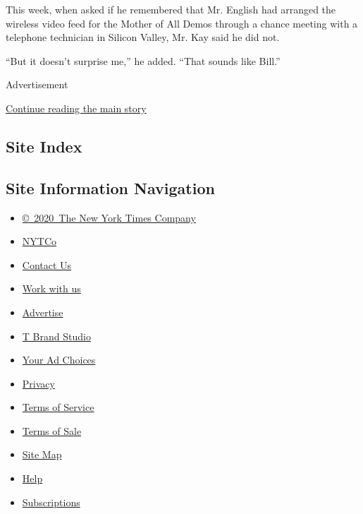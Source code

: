 This week, when asked if he remembered that Mr. English had arranged the
wireless video feed for the Mother of All Demos through a chance meeting
with a telephone technician in Silicon Valley, Mr. Kay said he did not.

``But it doesn't surprise me,'' he added. ``That sounds like Bill.''

Advertisement

\protect\hyperlink{after-bottom}{Continue reading the main story}

\hypertarget{site-index}{%
\subsection{Site Index}\label{site-index}}

\hypertarget{site-information-navigation}{%
\subsection{Site Information
Navigation}\label{site-information-navigation}}

\begin{itemize}
\tightlist
\item
  \href{https://help.nytimes3xbfgragh.onion/hc/en-us/articles/115014792127-Copyright-notice}{©~2020~The
  New York Times Company}
\end{itemize}

\begin{itemize}
\tightlist
\item
  \href{https://www.nytco.com/}{NYTCo}
\item
  \href{https://help.nytimes3xbfgragh.onion/hc/en-us/articles/115015385887-Contact-Us}{Contact
  Us}
\item
  \href{https://www.nytco.com/careers/}{Work with us}
\item
  \href{https://nytmediakit.com/}{Advertise}
\item
  \href{http://www.tbrandstudio.com/}{T Brand Studio}
\item
  \href{https://www.nytimes3xbfgragh.onion/privacy/cookie-policy\#how-do-i-manage-trackers}{Your
  Ad Choices}
\item
  \href{https://www.nytimes3xbfgragh.onion/privacy}{Privacy}
\item
  \href{https://help.nytimes3xbfgragh.onion/hc/en-us/articles/115014893428-Terms-of-service}{Terms
  of Service}
\item
  \href{https://help.nytimes3xbfgragh.onion/hc/en-us/articles/115014893968-Terms-of-sale}{Terms
  of Sale}
\item
  \href{https://spiderbites.nytimes3xbfgragh.onion}{Site Map}
\item
  \href{https://help.nytimes3xbfgragh.onion/hc/en-us}{Help}
\item
  \href{https://www.nytimes3xbfgragh.onion/subscription?campaignId=37WXW}{Subscriptions}
\end{itemize}
